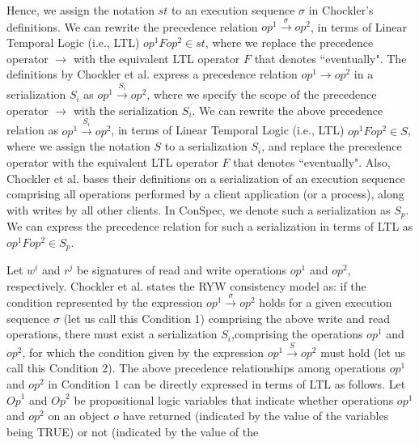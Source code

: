 \documentclass{sig-alternate-05-2015}
\begin{document}
 Hence,  we assign the notation $\mathit{st}$ to an execution sequence $\sigma$ in Chockler's definitions.
  We can rewrite the precedence relation $ \mathit{op}^1 \xrightarrow{\sigma} \mathit{op}^2 $, in terms of Linear Temporal Logic
 (i.e., LTL) $\mathit{op}^1 F \mathit{op}^2 \in \mathit{st}$, where we replace the precedence  operator $\rightarrow$ with the
 equivalent LTL operator $F$ that denotes ``eventually".
  The definitions by Chockler et al.  express a precedence relation $\mathit{op}^1 \rightarrow \mathit{op}^2$ in a serialization ${S_i}$
   as $\mathit{op}^1 \xrightarrow{S_i} \mathit{op}^2$,  where we specify the scope of the precedence operator $\rightarrow$
   with the serialization ${S_i}$. We can rewrite the above precedence relation as
  $ \mathit{op}^1 \xrightarrow{S_i} \mathit{op}^2 $, in terms of Linear Temporal Logic (i.e., LTL)
  $\mathit{op}^1 F \mathit{op}^2 \in S$,
  where we assign the notation $S$ to a serialization ${S_i}$, and replace the precedence
  operator with the equivalent LTL operator $F$ that denotes ``eventually". Also, Chockler et al.
  bases their definitions on a serialization of an execution sequence comprising all operations performed
  by a client application (or a process), along with writes by all other clients. In ConSpec,
  we denote such a serialization as $S_p$. We can express the precedence relation for such a
  serialization in terms of LTL  as $ \mathit{op}^1 F \mathit{op}^2 \in S_p$.
 \par Let $w^i$ and $r^j$ be signatures of read and write operations $\mathit{op}^1$ and
 $\mathit{op}^2$, respectively.
  Chockler et al. states the RYW consistency model as: if the condition represented by the expression
  $\mathit{op}^1 \xrightarrow{\sigma} \mathit{op}^2$ holds for a given execution sequence $\sigma$
  (let us call this Condition 1) comprising the above write and read operations, there must exist a serialization ${S_i}$,comprising the
   operations $\mathit{op}^1$ and $\mathit{op}^2$, for which the condition given by the expression
  $\mathit{op}^1 \xrightarrow{S} \mathit{op}^2$ must hold (let us call this Condition 2). The
  above precedence relationships among operations $\mathit{op}^1$ and $\mathit{op}^2$ in Condition 1 can be directly
  expressed in terms of LTL as follows. Let $\mathit{Op}^1$ and $\mathit{Op}^2$  be propositional logic
  variables that indicate whether operations $\mathit{op}^1$ and $\mathit{op}^2$ on an object $o$ have
  returned (indicated by the value of the variables being TRUE) or not (indicated by the value of the
\end{document}
